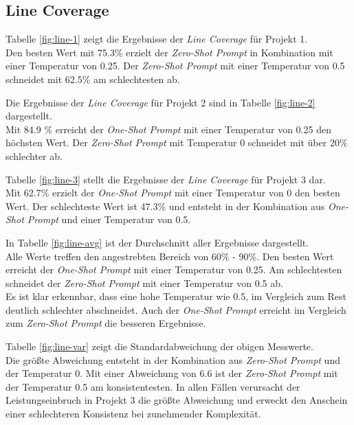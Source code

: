 \subsection{Line Coverage}
Tabelle \ref{fig:line-1} zeigt die Ergebnisse der \textit{Line Coverage} für Projekt 1. \\Den besten Wert mit 75.3\% erzielt der \textit{Zero-Shot Prompt} in Kombination mit einer Temperatur von 0.25. Der \textit{Zero-Shot Prompt} mit einer Temperatur von 0.5 schneidet mit 62.5\% am schlechtesten ab.

Die Ergebnisse der \textit{Line Coverage} für Projekt 2 sind in Tabelle \ref{fig:line-2} dargestellt. \\Mit 84.9 \% erreicht der \textit{One-Shot Prompt} mit einer Temperatur von 0.25 den höchsten Wert. Der \textit{Zero-Shot Prompt} mit Temperatur 0 schneidet mit über 20\% schlechter ab.

Tabelle \ref{fig:line-3} stellt die Ergebnisse der \textit{Line Coverage} für Projekt 3 dar. \\Mit 62.7\% erzielt der \textit{One-Shot Prompt} mit einer Temperatur von 0 den besten Wert. Der schlechteste Wert ist 47.3\% und entsteht in der Kombination aus \textit{One-Shot Prompt} und einer Temperatur von 0.5.

In Tabelle \ref{fig:line-avg} ist der Durchschnitt aller Ergebnisse dargestellt.\\ Alle Werte treffen den angestrebten Bereich von 60\% - 90\%. Den besten Wert erreicht der \textit{One-Shot Prompt} mit einer Temperatur von 0.25. Am schlechtesten schneidet der \textit{Zero-Shot Prompt} mit einer Temperatur von 0.5 ab. \\Es ist klar erkennbar, dass eine hohe Temperatur wie 0.5, im Vergleich zum Rest deutlich schlechter abschneidet. Auch der \textit{One-Shot Prompt} erreicht im Vergleich zum \textit{Zero-Shot Prompt} die besseren Ergebnisse.

Tabelle \ref{fig:line-var} zeigt die Standardabweichung der obigen Messwerte.\\ Die größte Abweichung entsteht in der Kombination aus \textit{Zero-Shot Prompt} und der Temperatur 0. Mit einer Abweichung von 6.6 ist der \textit{Zero-Shot Prompt} mit der Temperatur 0.5 am konsistentesten. In allen Fällen verursacht der Leistungseinbruch in Projekt 3 die größte Abweichung und erweckt den Anschein einer schlechteren Konsistenz bei zunehmender Komplexität.


